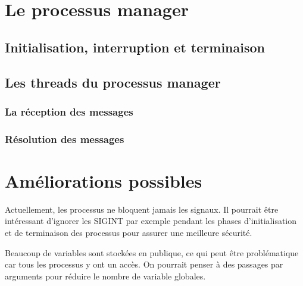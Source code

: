 \documentclass[a4paper,12pt]{article}
\begin{document}
\section{Le processus manager}

\subsection{Initialisation, interruption et terminaison}

\subsection{Les threads du processus manager}

\subsubsection{La réception des messages}

\subsubsection{Résolution des messages}


\section{Améliorations possibles}

Actuellement, les processus ne bloquent jamais les signaux. Il pourrait être intéressant d'ignorer les SIGINT par exemple pendant les phases d'initialisation et de terminaison des processus pour assurer une meilleure sécurité.

Beaucoup de variables sont stockées en publique, ce qui peut être problématique car tous les processus y ont un accès. On pourrait penser à des passages par arguments pour réduire le nombre de variable globales.
\end{document}
